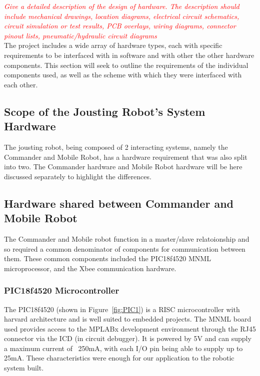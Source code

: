 \documentclass[11pt,a4paper]{article}
\begin{document}
  \textcolor{red}
  {
  \textit{Give a detailed description of the design of hardware. The description should include mechanical drawings, location diagrams, electrical circuit schematics, circuit simulation or test results, PCB overlays, wiring diagrams, connector pinout lists, pneumatic/hydraulic circuit diagrams}
  }
  \\The project includes a wide array of hardware types, each with specific requirements to be interfaced with in software and with other the other hardware components. This section will seek to outline the requirements of the individual components used, as well as the scheme with which they were interfaced with each other.

  \subsection{Scope of the Jousting Robot's System Hardware}
    The jousting robot, being composed of 2 interacting systems, namely the Commander and Mobile Robot, has a hardware requirement that was also split into two.
    The Commander hardware and Mobile Robot hardware will be here discussed separately to highlight the differences.
  \subsection{Hardware shared between Commander and Mobile Robot}
    The Commander and Mobile robot function in a master/slave relatoionship and so required a common denominator of components for communication between them. These common components included the PIC18f4520 MNML microprocessor, and the Xbee communication hardware.
    \subsubsection{PIC18f4520 Microcontroller}
    The PIC18f4520 (shown in Figure~\ref{fig:PIC1}) is a RISC microcontroller with harvard architecture and is well suited to embedded projects. The MNML board used provides access to the MPLABx development environment through the RJ45 connector via the ICD (in circuit debugger). It is powered by 5V and can supply a maximum current of ~250mA, with each I/O pin being able to supply up to 25mA. These characteristics were enough for our application to the robotic system built.
\end{document}
